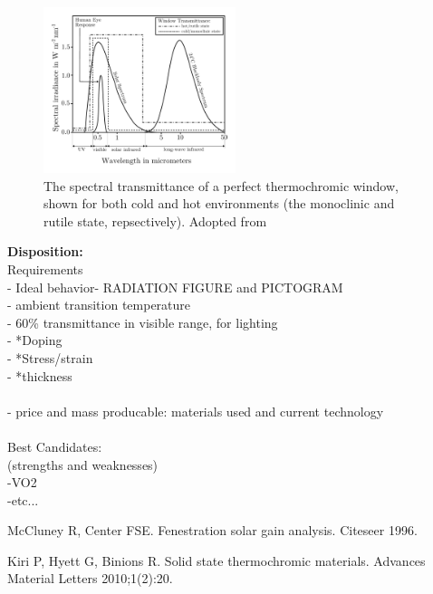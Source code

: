 \begin{figure}[h!]
  \centering
   \includegraphics[width=0.5\textwidth]{Figures/TCWtransmittanceMcCluney1996andKamali2013.pdf}
   \caption{The spectral transmittance of a perfect thermochromic window, shown for both 
   cold and hot environments (the monoclinic and rutile state, repsectively). 
   Adopted from \cite{McCluney1996} \cite{Kamalisarvestani2013}
   }
\end{figure}



\textbf{Disposition:}\\
Requirements\\
- Ideal behavior- RADIATION FIGURE and PICTOGRAM\\
- ambient transition temperature\\
- 60\% transmittance in visible range, for lighting\\
-  *Doping\\
-  *Stress/strain\\
-  *thickness\\
\\
- price and mass producable: materials used and current technology\\
\\
Best Candidates:\\
(strengths and weaknesses)\\
-VO2 \\
-etc...\\


\begin{thebibliography}{9}

      McCluney R, Center FSE. 
      Fenestration solar gain analysis. 
      Citeseer 1996.
      
      Kiri P, Hyett G, Binions R.
      Solid state thermochromic materials.
      Advances Material Letters 2010;1(2):20.

\end{thebibliography}
